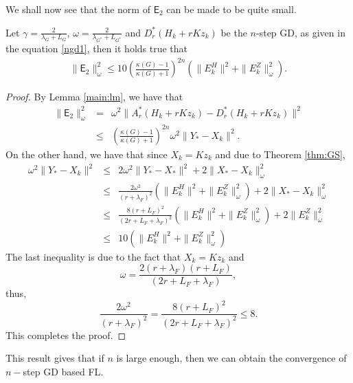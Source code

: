 We shall now see that the norm of $\textsf{E}_2$ can be made to be quite small. 
\begin{lemma}\label{gssmooth} 
Let $\gamma = \frac{2}{\lambda_G + L_G}$, $\omega = \frac{2}{\lambda_{G^*} + L_{G^*}}$ and $D_r^*(H_k + rKz_k)$ be the $n$-step GD, as given in the equation \eqref{ngd1}, then it holds true that 
\begin{eqnarray*}
\|\textsf{E}_2\|_\omega^2 \leq 10 \left ( \frac{\kappa(G) - 1}{\kappa(G) + 1} \right )^{2n} \left ( \|E_k^H\|^2 + \|E_k^Z\|_\omega^2 \right ). 
\end{eqnarray*}
\end{lemma}
\begin{proof}
By Lemma \ref{main:lm}, we have that 
\begin{eqnarray*}
\|\textsf{E}_2\|_\omega^2 &=& \omega^2 \|A_r^*(H_k + rKz_k) - D_r^*(H_k + rKz_k)\|^2 \\
&\leq& \left ( \frac{\kappa(G) - 1}{\kappa(G) + 1} \right )^{2n} \omega^2 \|Y_* - X_k\|^2. 
\end{eqnarray*}
On the other hand, we have that since $X_k = Kz_k$ and due to Theorem \ref{thm:GS},  
\begin{eqnarray*}
\omega^2 \|Y_* - X_k\|^2 &\leq& 2 \omega^2 \|Y_* - X_*\|^2 + 2 \|X_* - X_k\|_\omega^2 \\ 
&\leq& \frac{2 \omega^2}{(r + \lambda_F)^2} \left ( \|E_k^H\|^2 + \|E_k^Z\|_\omega ^2 \right ) + 2 \|X_* - X_k\|_\omega^2 \\
&\leq& \frac{8(r + L_F)^2}{(2r + L_F + \lambda_F)^2} \left ( \|E_k^H\|^2 + \|E_k^Z\|_\omega ^2 \right ) + 2 \|E_k^Z\|_\omega^2 \\ 
&\leq& 10 \left ( \|E_k^H\|^2 + \|E_k^Z\|_\omega ^2 \right ) \end{eqnarray*} 
The last inequality is due to the fact that $X_k = Kz_k$ and 
\begin{equation}
\omega = \frac{2(r + \lambda_F)(r + L_F)}{(2r + L_F + \lambda_F)},
\end{equation} 
thus, 
\begin{equation}
\frac{2 \omega^2}{(r + \lambda_F)^2} = \frac{8(r+L_F)^2}{(2r + L_F + \lambda_F)^2}  \leq 8.  
\end{equation}
This completes the proof. 
\end{proof}
This result gives that if $n$ is large enough, then we can obtain the convergence of $n-$step GD based FL. 

